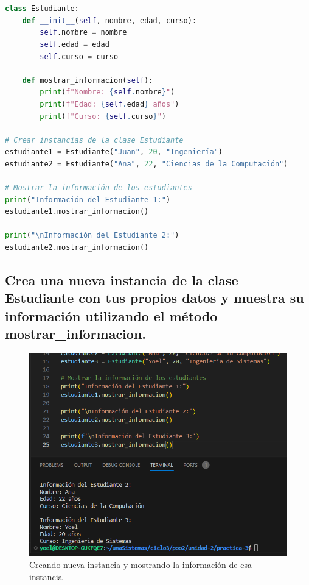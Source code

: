 \documentclass[11pt,a4paper]{article}
\begin{document}
\begin{lstlisting}[language=Python, style=mystyle, caption={Código base sin modificaciones.}]


class Estudiante:
    def __init__(self, nombre, edad, curso):
        self.nombre = nombre
        self.edad = edad
        self.curso = curso

    def mostrar_informacion(self):
        print(f"Nombre: {self.nombre}")
        print(f"Edad: {self.edad} años")
        print(f"Curso: {self.curso}")

# Crear instancias de la clase Estudiante
estudiante1 = Estudiante("Juan", 20, "Ingeniería")
estudiante2 = Estudiante("Ana", 22, "Ciencias de la Computación")

# Mostrar la información de los estudiantes
print("Información del Estudiante 1:")
estudiante1.mostrar_informacion()

print("\nInformación del Estudiante 2:")
estudiante2.mostrar_informacion()


\end{lstlisting}

\subsection{Crea una nueva instancia de la clase Estudiante con tus propios datos y muestra su información utilizando el método mostrar\_informacion.}

\begin{figure}[H]
    \centering
    \includegraphics[width=0.9\linewidth]{images/2.png}
    \caption{Creando nueva instancia y mostrando la información de esa instancia}
    \label{fig:enter-label}
\end{figure}
\end{document}

